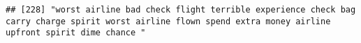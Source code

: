 \documentclass[
]{article}
\begin{document}
\begin{verbatim}
## [228] "worst airline bad check flight terrible experience check bag carry charge spirit worst airline flown spend extra money airline upfront spirit dime chance "                                                                                                                                                                                                                                                                                                                                                                                                                                                                                                                                                                                                                                                                                                                                                                                                                                                                                                                                                                                                                                                                                                                                                                                                                                                                                                                                                                                                                                                                                                                                                                                                                                    

\end{verbatim}
\end{document}
